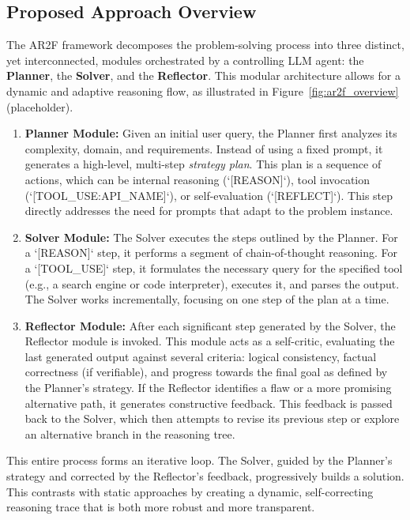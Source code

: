 \documentclass{article}
\begin{document}
\subsection{Proposed Approach Overview}
The AR2F framework decomposes the problem-solving process into three distinct, yet interconnected, modules orchestrated by a controlling LLM agent: the \textbf{Planner}, the \textbf{Solver}, and the \textbf{Reflector}. This modular architecture allows for a dynamic and adaptive reasoning flow, as illustrated in Figure~\ref{fig:ar2f_overview} (placeholder).

\begin{enumerate}
    \item \textbf{Planner Module:} Given an initial user query, the Planner first analyzes its complexity, domain, and requirements. Instead of using a fixed prompt, it generates a high-level, multi-step \textit{strategy plan}. This plan is a sequence of actions, which can be internal reasoning (`[REASON]`), tool invocation (`[TOOL_USE:API_NAME]`), or self-evaluation (`[REFLECT]`). This step directly addresses the need for prompts that adapt to the problem instance.

    \item \textbf{Solver Module:} The Solver executes the steps outlined by the Planner. For a `[REASON]` step, it performs a segment of chain-of-thought reasoning. For a `[TOOL_USE]` step, it formulates the necessary query for the specified tool (e.g., a search engine or code interpreter), executes it, and parses the output. The Solver works incrementally, focusing on one step of the plan at a time.

    \item \textbf{Reflector Module:} After each significant step generated by the Solver, the Reflector module is invoked. This module acts as a self-critic, evaluating the last generated output against several criteria: logical consistency, factual correctness (if verifiable), and progress towards the final goal as defined by the Planner's strategy. If the Reflector identifies a flaw or a more promising alternative path, it generates constructive feedback. This feedback is passed back to the Solver, which then attempts to revise its previous step or explore an alternative branch in the reasoning tree.
\end{enumerate}

This entire process forms an iterative loop. The Solver, guided by the Planner's strategy and corrected by the Reflector's feedback, progressively builds a solution. This contrasts with static approaches by creating a dynamic, self-correcting reasoning trace that is both more robust and more transparent.
\end{document}
